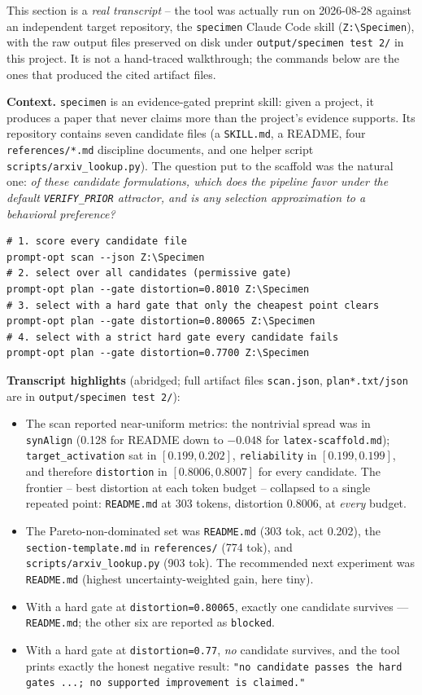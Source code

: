This section is a \emph{real transcript} -- the tool was actually run on
2026-08-28 against an independent target repository, the \texttt{specimen}
Claude Code skill (\texttt{Z:\textbackslash Specimen}), with the raw output files
preserved on disk under \texttt{output/specimen test 2/} in this project. It is
not a hand-traced walkthrough; the commands below are the ones that produced the
cited artifact files.

\textbf{Context.} \texttt{specimen} is an evidence-gated preprint skill: given a
project, it produces a paper that never claims more than the project's evidence
supports. Its repository contains seven candidate files (a \texttt{SKILL.md}, a
README, four \texttt{references/*.md} discipline documents, and one helper
script \texttt{scripts/arxiv\_lookup.py}). The question put to the scaffold was
the natural one: \emph{of these candidate formulations, which does the pipeline
favor under the default \texttt{VERIFY\_PRIOR} attractor, and is any selection
approximation to a behavioral preference?}

\begin{verbatim}
# 1. score every candidate file
prompt-opt scan --json Z:\Specimen
# 2. select over all candidates (permissive gate)
prompt-opt plan --gate distortion=0.8010 Z:\Specimen
# 3. select with a hard gate that only the cheapest point clears
prompt-opt plan --gate distortion=0.80065 Z:\Specimen
# 4. select with a strict hard gate every candidate fails
prompt-opt plan --gate distortion=0.7700 Z:\Specimen
\end{verbatim}

\textbf{Transcript highlights} (abridged; full artifact files
\texttt{scan.json}, \texttt{plan*.txt/json} are in \texttt{output/specimen test
2/}):

\begin{itemize}[leftmargin=*]
  \item The scan reported near-uniform metrics: the nontrivial spread was in
  \texttt{synAlign} (0.128 for README down to $-0.048$ for
  \texttt{latex-scaffold.md}); \texttt{target\_activation} sat in
  $[0.199,0.202]$, \texttt{reliability} in $[0.199,0.199]$, and therefore
  \texttt{distortion} in $[0.8006,0.8007]$ for every candidate. The frontier --
  best distortion at each token budget -- collapsed to a single repeated point:
  \texttt{README.md} at 303 tokens, distortion 0.8006, at \emph{every} budget.
  \item The Pareto-non-dominated set was \texttt{README.md} (303 tok, act 0.202),
  the \texttt{section-template.md} in \texttt{references/} (774 tok), and
  \texttt{scripts/arxiv\_lookup.py} (903 tok). The recommended next experiment
  was \texttt{README.md} (highest uncertainty-weighted gain, here tiny).
  \item With a hard gate at \texttt{distortion=0.80065}, exactly one candidate
  survives --- \texttt{README.md}; the other six are reported as \texttt{blocked}.
  \item With a hard gate at \texttt{distortion=0.77}, \emph{no} candidate
  survives, and the tool prints exactly the honest negative result:
  \texttt{"no candidate passes the hard gates ...; no supported improvement
  is claimed."}
\end{itemize}

